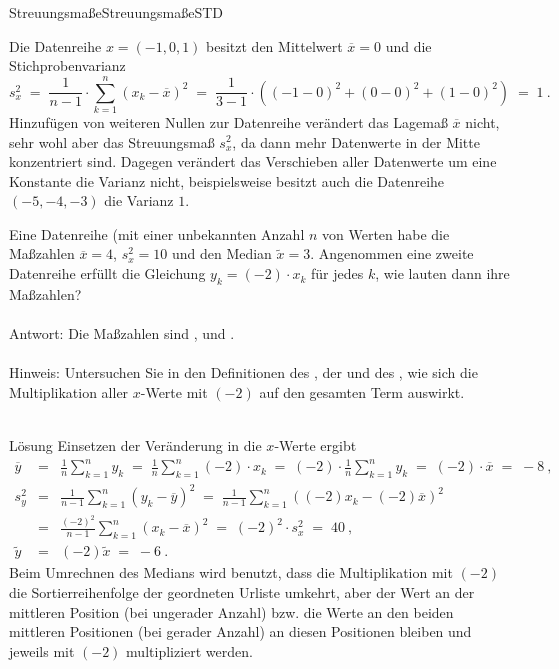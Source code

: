 \begin{MXContent}{Streuungsmaße}{Streuungsmaße}{STD}
\begin{MExample}
Die Datenreihe $x=(-1,0,1)$ besitzt den Mittelwert $\overline{x}=0$ und die Stichprobenvarianz
$$
s^2_x \;=\;\frac{1}{n-1}\cdot \sum\limits_{k=1}^{n}(x_{k}-\overline{x})^{2}\;=\; \frac1{3-1}\cdot \left({(-1-0)^2+(0-0)^2+(1-0)^2}\right)\;=\; 1\: .
$$
Hinzufügen von weiteren Nullen zur Datenreihe verändert das Lagemaß $\overline{x}$ nicht, sehr wohl aber das Streuungsmaß $s^2_x$, da dann mehr Datenwerte in der Mitte konzentriert sind.
Dagegen verändert das Verschieben aller Datenwerte um eine Konstante die Varianz nicht, beispielsweise besitzt auch die Datenreihe $(-5,-4,-3)$ die Varianz $1$.
\end{MExample}

\begin{MExercise}
Eine Datenreihe (mit einer unbekannten Anzahl $n$ von Werten habe die Maßzahlen $\overline{x}=4$, $s^2_x=10$ und den Median $\tilde x=3$.
Angenommen eine zweite Datenreihe erfüllt die Gleichung $y_k = (-2)\cdot x_k$ für jedes $k$, wie lauten dann ihre Maßzahlen?
\ \\ \ \\
Antwort: Die Maßzahlen sind , 
und .
\ \\ \ \\
Hinweis: Untersuchen Sie in den Definitionen des , der  und des
, wie sich die Multiplikation aller $x$-Werte mit $(-2)$ auf den gesamten Term auswirkt.
\ \\ \ \\
\begin{MHint}{Lösung}
Einsetzen der Veränderung in die $x$-Werte ergibt
\begin{eqnarray*}
\overline{y} &=& \frac1n\sum_{k=1}^n y_k \;=\;\frac1n\sum_{k=1}^n (-2)\cdot x_k \;=\; (-2)\cdot \frac1n\sum_{k=1}^n y_k \;=\; (-2)\cdot \overline{x} \;=\; -8\:,\\
s^2_y &=& \frac1{n-1}\sum_{k=1}^n \left({y_k-\overline{y}}\right)^2 \;=\;\frac1{n-1}\sum_{k=1}^n \left({(-2)x_k-(-2)\overline{x}}\right)^2\ \\
&=& \frac{(-2)^2}{n-1}\sum_{k=1}^n \left({x_k-\overline{x}}\right)^2 \;=\; (-2)^2\cdot s_x^2 \;=\;40\: ,\ \\
\tilde{y} &=& (-2)\tilde{x} \;=\; -6\: .
\end{eqnarray*}
Beim Umrechnen des Medians wird benutzt, dass die Multiplikation mit $(-2)$ die Sortierreihenfolge der geordneten Urliste umkehrt,
aber der Wert an der mittleren Position (bei ungerader Anzahl) bzw. die Werte an den beiden mittleren Positionen (bei gerader Anzahl) an diesen
Positionen bleiben und jeweils mit $(-2)$ multipliziert werden.
\end{MHint}
\end{MExercise}
\end{MXContent}


